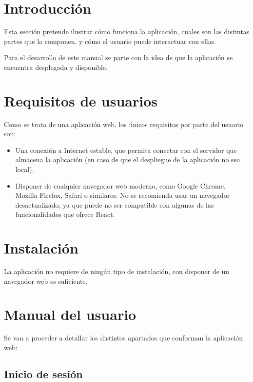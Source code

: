 
\section{Introducción}

Esta sección pretende ilustrar cómo funciona la aplicación, cuales son las distintas partes que la componen, y cómo el usuario puede interactuar con ellas. 

Para el desarrollo de este manual se parte con la idea de que la aplicación se encuentra desplegada y disponible.

\section{Requisitos de usuarios}

Como se trata de una aplicación web, los únicos requisitos por parte del usuario son:

\begin{itemize}
  \item Una conexión a Internet estable, que permita conectar con el servidor que almacena la aplicación (en caso de que el despliegue de la aplicación no sea local).
  \item Disponer de cualquier navegador web moderno, como Google Chrome, Mozilla Firefox, Safari o similares. No se recomienda usar un navegador desactualizado, ya que puede no ser compatible con algunas de las funcionalidades que ofrece React.
\end{itemize}


\section{Instalación}

La aplicación no requiere de ningún tipo de instalación, con disponer de un navegador web es suficiente.

\section{Manual del usuario}

Se van a proceder a detallar los distintos apartados que conforman la aplicación web:


\subsection{Inicio de sesión}

